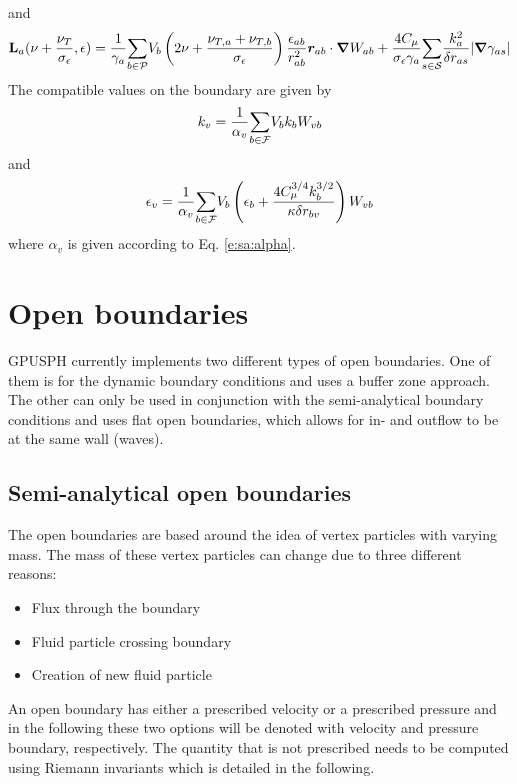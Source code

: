 \documentclass{../GPUSPHtemplate}
\begin{document}
and
\begin{equation}
\textbf{L}_a(\nu + \frac{\nu_T}{\sigma_\epsilon}, \epsilon) = \frac{1}{\gamma_a}\underset{b \in \mathcal{P}}{\sum} V_b
\left( 2\nu + \frac{\nu_{T,a} + \nu_{T,b}}{\sigma_\epsilon} \right)
\frac{\epsilon_{ab}}{r_{ab}^2}\bm{r}_{ab}\cdot \bm{\nabla} W_{ab} +
\frac{4 C_\mu}{\sigma_\epsilon \gamma_a}\underset{s \in \mathcal{S}}{\sum}\frac{k_a^2}{\delta
r_{as}}|\bm{\nabla} \gamma_{as}|
\label{e:turb:eps-lap-sa}
\end{equation}
The compatible values on the boundary are given by
\begin{equation}
k_v = \frac{1}{\alpha_v}\underset{b \in \mathcal{F}}{\sum} V_b k_b W_{vb}
\label{e:turb:k-bound-sa}
\end{equation}
and
\begin{equation}
\epsilon_v = \frac{1}{\alpha_v}\underset{b \in \mathcal{F}}{\sum} V_b \left( \epsilon_b +
\frac{4 C_\mu^{3/4} k_b^{3/2}}{\kappa \delta r_{bv}} \right) W_{vb}
\label{e:turb:eps-bound-sa}
\end{equation}
where $\alpha_v$ is given according to Eq. \eqref{e:sa:alpha}.


\section{Open boundaries}
GPUSPH currently implements two different types of open boundaries. One
of them is for the dynamic boundary conditions and uses a buffer zone
approach. The other can only be used in conjunction with the
semi-analytical boundary conditions and uses flat open boundaries, which
allows for in- and outflow to be at the same wall (\eg waves).

\subsection{Semi-analytical open boundaries}

The open boundaries are based around the idea of vertex particles with
varying mass. The mass of these vertex particles can change due to three
different reasons:
\begin{itemize}
\item Flux through the boundary
\item Fluid particle crossing boundary
\item Creation of new fluid particle
\end{itemize}
An open boundary has either a prescribed velocity or a prescribed
pressure and in the following these two options will be denoted with
velocity and pressure boundary, respectively. The quantity that is not
prescribed needs to be computed using Riemann invariants which is
detailed in the following.
\end{document}

